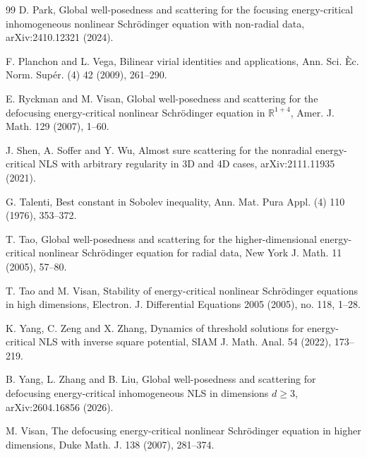 \documentclass{interact}
\numberwithin{equation}{section}
\theoremstyle{plain}
\theoremstyle{definition}
\theoremstyle{remark}
\newcommand{\R}{\mathbb R}
\begin{document}
\begin{thebibliography}{99}
D. Park, Global well-posedness and scattering for the focusing energy-critical inhomogeneous nonlinear Schr\"odinger equation with non-radial data, arXiv:2410.12321 (2024).

F. Planchon and L. Vega, Bilinear virial identities and applications, Ann. Sci. \`Ec. Norm. Sup\'er. (4) 42 (2009), 261--290.

E. Ryckman and M. Visan, Global well-posedness and scattering for the defocusing energy-critical nonlinear Schr\"odinger equation in $\R^{1+4}$,
Amer. J. Math. 129 (2007), 1--60.

J. Shen, A. Soffer and Y. Wu, Almost sure scattering for the nonradial energy-critical NLS with arbitrary regularity in 3D and 4D cases, arXiv:2111.11935 (2021).

G. Talenti, Best constant in Sobolev inequality, Ann. Mat. Pura Appl. (4) 110 (1976), 353--372.

T. Tao, Global well-posedness and scattering for the higher-dimensional energy-critical nonlinear Schr\"odinger equation for radial data, New York J. Math. 11 (2005), 57--80.

T. Tao and M. Visan, Stability of energy-critical nonlinear Schr\"odinger equations in high dimensions, Electron. J. Differential Equations 2005 (2005), no. 118, 1--28.

K. Yang, C. Zeng and X. Zhang, Dynamics of threshold solutions for energy-critical NLS with inverse square potential, SIAM J. Math. Anal. 54 (2022), 173--219.

B. Yang, L. Zhang and B. Liu, Global well-posedness and scattering for defocusing energy-critical inhomogeneous NLS in dimensions $d\ge3$, arXiv:2604.16856 (2026).

M. Visan, The defocusing energy-critical nonlinear Schr\"odinger equation in higher dimensions,
Duke Math. J. 138 (2007), 281--374.

\end{thebibliography}
\end{document}
